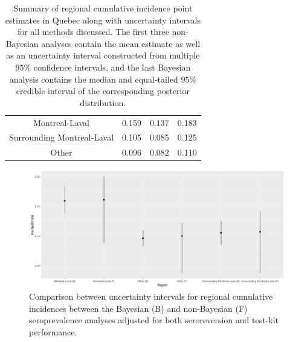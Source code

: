 \begin{table}[]
\begin{tabular}{c|ccc}
Montreal-Laval             & 0.159               & 0.137                  & 0.183                  \\
Surrounding Montreal-Laval & 0.105               & 0.085                  & 0.125                  \\
Other                      & 0.096               & 0.082                  & 0.110                 
\end{tabular}
\caption{Summary of regional cumulative incidence point estimates in Quebec along with uncertainty intervals for all methods discussed. The first three non-Bayesian analyses contain the mean estimate as well as an uncertainty interval constructed from multiple $95$\% confidence intervals, and the last Bayesian analysis contains the median and equal-tailed $95$\% credible interval of the corresponding posterior distribution.}
\label{tab:results}
\end{table}

\captionsetup[subfigure]{labelformat=empty}
\begin{figure}[H]
\centering
    \includegraphics[width=\columnwidth]{../../plot/intervals.png}
    \caption{Comparison between uncertainty intervals for regional cumulative incidences between the Bayesian (B) and non-Bayesian (F) seroprevalence analyses adjusted for both seroreversion and test-kit performance.}
    \label{fig:intervals}
\end{figure}